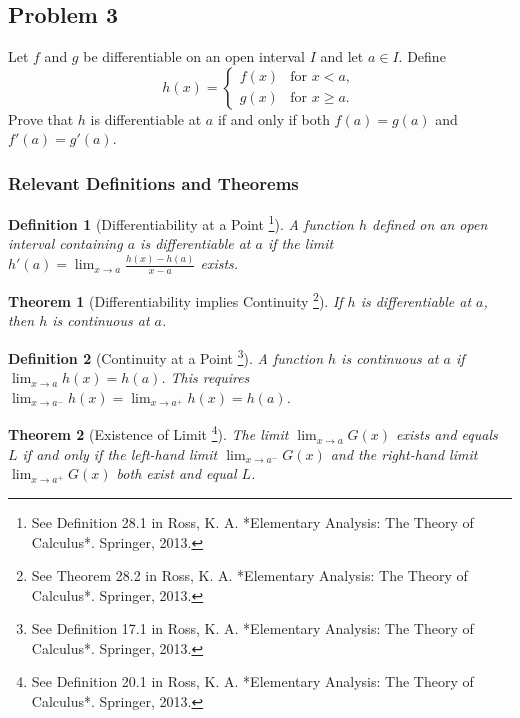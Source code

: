 \documentclass{article}
\newtheorem*{definition}{Definition}
\newtheorem*{theorem}{Theorem}
\begin{document}
\hrulefill

\subsection*{Problem 3}

Let \(f\) and \(g\) be differentiable on an open interval \(I\) and let \(a\in I\). Define
\[ h(x) = \begin{cases} f(x) & \text{for } x<a, \\ g(x) & \text{for } x\ge a. \end{cases} \]
Prove that \(h\) is differentiable at \(a\) if and only if both \(f(a)=g(a)\) and \(f'(a)=g'(a)\).

\subsubsection*{Relevant Definitions and Theorems}

\begin{definition}[Differentiability at a Point \footnote{See Definition 28.1 in Ross, K. A. *Elementary Analysis: The Theory of Calculus*. Springer, 2013.}]
A function \(h\) defined on an open interval containing \(a\) is differentiable at \(a\) if the limit \(h'(a) = \lim_{x \to a} \frac{h(x) - h(a)}{x - a}\) exists.
\end{definition}

\begin{theorem}[Differentiability implies Continuity \footnote{See Theorem 28.2 in Ross, K. A. *Elementary Analysis: The Theory of Calculus*. Springer, 2013.}]
If \(h\) is differentiable at \(a\), then \(h\) is continuous at \(a\).
\end{theorem}

\begin{definition}[Continuity at a Point \footnote{See Definition 17.1 in Ross, K. A. *Elementary Analysis: The Theory of Calculus*. Springer, 2013.}]
A function \(h\) is continuous at \(a\) if \(\lim_{x \to a} h(x) = h(a)\). This requires \(\lim_{x \to a^-} h(x) = \lim_{x \to a^+} h(x) = h(a)\).
\end{definition}

\begin{theorem}[Existence of Limit \footnote{See Definition 20.1 in Ross, K. A. *Elementary Analysis: The Theory of Calculus*. Springer, 2013.}]
The limit \(\lim_{x \to a} G(x)\) exists and equals \(L\) if and only if the left-hand limit \(\lim_{x \to a^-} G(x)\) and the right-hand limit \(\lim_{x \to a^+} G(x)\) both exist and equal \(L\).
\end{theorem}
\end{document}
